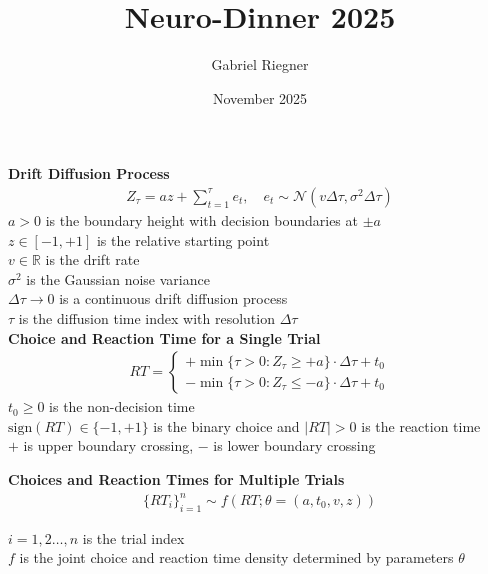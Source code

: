 \documentclass[8pt,aspectratio=169]{beamer}
\title{Neuro-Dinner 2025}
\author[]{Gabriel Riegner}
\date{November 2025}
\begin{document}
\begin{frame}{}
\textbf{Drift Diffusion Process}
\begin{align}
    Z_\tau = a z + \sum_{t=1}^\tau e_t, \quad e_t \sim \mathcal{N}(v\Delta \tau, \sigma^2 \Delta \tau)
\end{align}
$a > 0$ is the boundary height with decision boundaries at $\pm a$\\
$z \in [-1, +1]$ is the relative starting point \\
$v \in \mathbb{R}$ is the drift rate\\
$\sigma^2$ is the Gaussian noise variance\\
$\Delta \tau \to 0$ is a continuous drift diffusion process\\
$\tau$ is the diffusion time index with resolution $\Delta\tau$\\

\vfill
\textbf{Choice and Reaction Time for a Single Trial}
\begin{align}
    RT = \begin{cases}
        + \min\{\tau>0: Z_\tau \ge +a\} \cdot \Delta\tau + t_0\\
        - \min\{\tau>0: Z_\tau \le -a\} \cdot \Delta\tau + t_0
        \end{cases}
\end{align}
$t_0 \ge 0$ is the non-decision time\\
$\text{sign}(RT) \in \{-1, +1\}$ is the binary choice and $|RT|> 0$ is the reaction time\\
$+$ is upper boundary crossing, $-$ is lower boundary crossing

\vfill
\textbf{Choices and Reaction Times for Multiple Trials}
\begin{align}
    \{RT_i\}_{i=1}^n \sim f(RT;\theta = (a, t_0, v, z))
\end{align}

$i = 1, 2 \ldots,n$ is the trial index\\
$f$ is the joint choice and reaction time density determined by parameters $\theta$
\end{frame}
\end{document}
